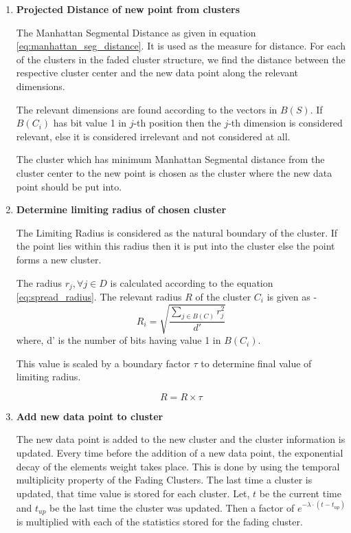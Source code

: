 \documentclass[a4paper,12bp]{report}
\begin{document}
\begin{enumerate}
\item \textbf{Projected Distance of new point from clusters}

The Manhattan Segmental Distance as given in equation \ref{eq:manhattan_seg_distance}. It is used as the measure for distance. For each of the clusters in the faded cluster structure, we find the distance between the respective cluster center and the new data point along the relevant dimensions. 

The relevant dimensions are found according to the vectors in $B(S)$. If $B(C_i)$ has bit value 1 in $j$-th position then the $j$-th dimension is considered relevant, else it is considered irrelevant and not considered at all.

The cluster which has minimum Manhattan Segmental distance from the cluster center to the new point is chosen as the cluster where the new data point should be put into. 

\item \textbf{Determine limiting radius of chosen cluster}

The Limiting Radius is considered as the natural boundary of the cluster. If the point lies within this radius then it is put into the cluster else the point forms a new cluster. 

The radius $r_j, \forall j \in D$ is calculated according to the equation \ref{eq:spread_radius}. The relevant radius $R$ of the cluster $C_i$ is given as -
\begin{equation}
R_i = \sqrt{ \frac{\sum_{j \in B(C)} r_j^2}{d'} }
\end{equation}
where, d' is the number of bits having value 1 in $B(C_i)$.

This value is scaled by a boundary factor $\tau$ to determine final value of limiting radius. 

\begin{equation}
R = R \times \tau
\end{equation}
\newpage
\item \textbf{Add new data point to cluster}

The new data point is added to the new cluster and the cluster information is updated. Every time before the addition of a new data point, the exponential decay of the elements weight takes place. This is done by using the temporal multiplicity property of the Fading Clusters. The last time a cluster is updated, that time value is stored for each cluster. Let, $t$ be the current time and $t_{up}$ be the last time the cluster was updated. Then a factor of $e^{- \lambda \cdot (t-t_{up})}$ is multiplied with each of the statistics stored for the fading cluster. 


\end{enumerate}
\end{document}
